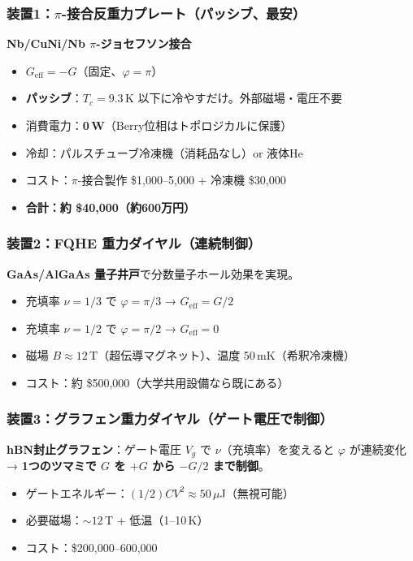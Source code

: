 \documentclass[11pt,a4paper]{article}
\begin{document}
\subsubsection{装置1：$\pi$-接合反重力プレート（パッシブ、最安）}

\begin{tcolorbox}[colback=green!5,colframe=green!60!black,title=推奨装置]
\textbf{Nb/CuNi/Nb $\pi$-ジョセフソン接合}
\begin{itemize}
\item $G_{\mathrm{eff}} = -G$（固定、$\varphi = \pi$）
\item \textbf{パッシブ}：$T_c = 9.3$\,K 以下に冷やすだけ。外部磁場・電圧不要
\item 消費電力：\textbf{0\,W}（Berry位相はトポロジカルに保護）
\item 冷却：パルスチューブ冷凍機（消耗品なし）or 液体He
\item コスト：$\pi$-接合製作 \$1,000--5,000 + 冷凍機 \$30,000
\item \textbf{合計：約 \$40,000（約600万円）}
\end{itemize}
\end{tcolorbox}

\subsubsection{装置2：FQHE 重力ダイヤル（連続制御）}

\textbf{GaAs/AlGaAs 量子井戸}で分数量子ホール効果を実現。
\begin{itemize}
\item 充填率 $\nu = 1/3$ で $\varphi = \pi/3$ → $G_{\mathrm{eff}} = G/2$
\item 充填率 $\nu = 1/2$ で $\varphi = \pi/2$ → $G_{\mathrm{eff}} = 0$
\item 磁場 $B \approx 12$\,T（超伝導マグネット）、温度 50\,mK（希釈冷凍機）
\item コスト：約 \$500,000（大学共用設備なら既にある）
\end{itemize}

\subsubsection{装置3：グラフェン重力ダイヤル（ゲート電圧で制御）}

\textbf{hBN封止グラフェン}：ゲート電圧 $V_g$ で $\nu$（充填率）を変えると
$\varphi$ が連続変化 → \textbf{1つのツマミで $G$ を $+G$ から $-G/2$ まで制御}。
\begin{itemize}
\item ゲートエネルギー：$(1/2)CV^2 \approx 50\,\mu$J（無視可能）
\item 必要磁場：$\sim 12$\,T + 低温（1--10\,K）
\item コスト：\$200,000--600,000
\end{itemize}
\end{document}
